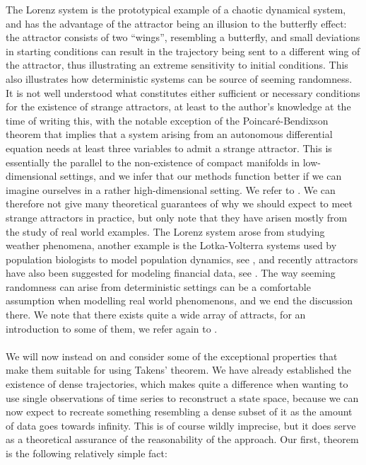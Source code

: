 \documentclass[11pt, a4paper]{memoir}
\theoremstyle{break}
\theoremstyle{break}
\theoremstyle{nonumberplain}
\begin{document}
The Lorenz system is the prototypical example of a chaotic dynamical system, and has the advantage of the attractor being an illusion to the butterfly effect: the attractor consists of two \enquote{wings}, resembling a butterfly, and small deviations in starting conditions can result in the trajectory being sent to a different wing of the attractor, thus illustrating an extreme sensitivity to initial conditions. This also illustrates how deterministic systems can be source of seeming randomness. It is not well understood what constitutes either sufficient or necessary conditions for the existence of strange attractors, at least to the author's knowledge at the time of writing this, with the notable exception of the Poincaré-Bendixson theorem that implies that a system arising from an autonomous differential equation needs at least three variables to admit a strange attractor. This is essentially the parallel to the non-existence of compact manifolds in low-dimensional settings, and we infer that our methods function better if we can imagine ourselves in a rather high-dimensional setting. We refer to \cite{Hilborn}. We can therefore not give many theoretical guarantees of why we should expect to meet strange attractors in practice, but only note that they have arisen mostly from the study of real world examples. The Lorenz system arose from studying weather phenomena, another example is the Lotka-Volterra systems used by population biologists to model population dynamics, see \cite{Sprott}, and recently attractors have also been suggested for modeling financial data, see \cite{finance}. The way seeming randomness can arise from deterministic settings can be a comfortable assumption when modelling real world phenomenons, and we end the discussion there. We note that there exists quite a wide array of attracts, for an introduction to some of them, we refer again to \cite{Sprott}.\\\\
We will now instead on and consider some of the exceptional properties that make them suitable for using Takens' theorem. We have already established the existence of dense trajectories, which makes quite a difference when wanting to use single observations of time series to reconstruct a state space, because we can now expect to recreate something resembling a dense subset of it as the amount of data goes towards infinity. This is of course wildly imprecise, but it does serve as a theoretical assurance of the reasonability of the approach. Our first, theorem is the following relatively simple fact:
\end{document}
